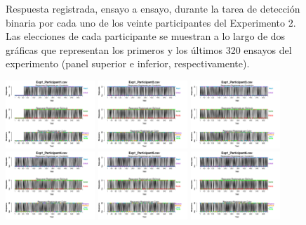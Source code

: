 \begin{figure}[th]
\caption[Response_Exp2]{Respuesta registrada, ensayo a ensayo, durante la tarea de detección binaria por cada uno de los veinte participantes del Experimento 2. Las elecciones de cada participante se muestran a lo largo de dos gráficas que representan los primeros y los últimos 320 ensayos del experimento (panel superior e inferior, respectivamente).}
\label{fig:Response_E2}
\end{figure}

\begin{figure}[th]
\centering
\includegraphics[width=0.30\textwidth]{Figures/BiasResp_Exp1_P1} \includegraphics[width=0.30\textwidth]{Figures/BiasResp_Exp1_P2} \includegraphics[width=0.30\textwidth]{Figures/BiasResp_Exp1_P3}
\includegraphics[width=0.30\textwidth]{Figures/BiasResp_Exp1_P4} \includegraphics[width=0.30\textwidth]{Figures/BiasResp_Exp1_P5} \includegraphics[width=0.30\textwidth]{Figures/BiasResp_Exp1_P6}

\end{figure}
